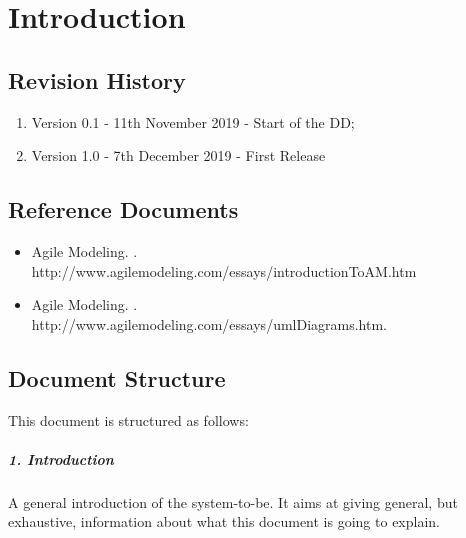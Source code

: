 \documentclass[../DD.tex]{subfiles}
\begin{document}
\chapter{Introduction}
\thispagestyle{fancy}
		
		
		
		
		\section{Revision History}
		\begin{enumerate}
			\item Version 0.1 - 11th November 2019 - Start of the DD;
			
			\item Version 1.0 - 7th December 2019 - First Release
			
		\end{enumerate}
		\section{Reference Documents}
		\begin{itemize}
			\item Agile Modeling. . \\ http://www.agilemodeling.com/essays/introductionToAM.htm
			\item Agile Modeling. . \\ http://www.agilemodeling.com/essays/umlDiagrams.htm.
		\end{itemize}
		\section{Document Structure}
		This document is structured as follows:
		\paragraph{1. Introduction}
		A general introduction of the system-to-be. It aims at giving general, but exhaustive, information about what this document is going to explain.
\end{document}

